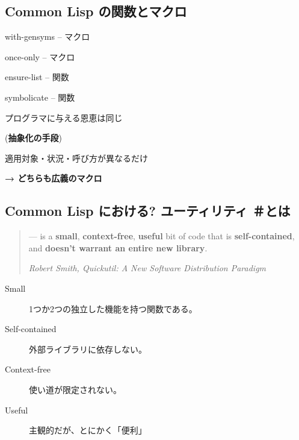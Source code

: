 \subsection{Common Lisp の関数とマクロ}
\label{sec-2-3}

\begin{container-fluid}
\begin{row-fluid}
\begin{span6}
with-gensyms -- マクロ

once-only -- マクロ

ensure-list -- 関数

symbolicate -- 関数
\end{span6}
\begin{span6}
プログラマに与える恩恵は同じ

\begin{alignright}
(\textbf{抽象化の手段})
\end{alignright}

適用対象・状況・呼び方が異なるだけ

\begin{alignright}
\textbf{→ どちらも広義のマクロ}
\end{alignright}
\end{span6}
\end{row-fluid}
\end{container-fluid}

\subsection{Common Lisp における? ユーティリティ ＃とは}
\label{sec-2-4}

\begin{quote}
--- is a \textbf{small}, \textbf{context-free}, \textbf{useful} bit of code that is
\textbf{self-contained}, and \textbf{doesn't warrant an entire new library}.

\begin{alignright}
\emph{Robert Smith, Quickutil: A New Software Distribution Paradigm}
\end{alignright}
\end{quote}

\begin{description}
\item[{Small}] 1つか2つの独立した機能を持つ関数である。
\item[{Self-contained}] 外部ライブラリに依存しない。
\item[{Context-free}] 使い道が限定されない。
\item[{Useful}] 主観的だが、とにかく「便利」
\end{description}


